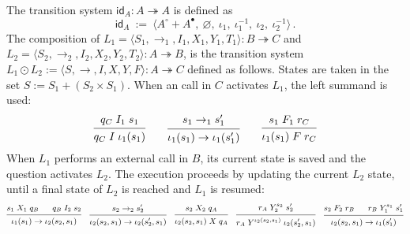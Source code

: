 \documentclass[acmsmall,screen,review,anonymous]{acmart}
\newcommand{\kw}[1]{\ensuremath{ \mathsf{#1} }}
\newcommand{\que}{\circ}
\newcommand{\ans}{\bullet}
\begin{document}
\begin{definition} \label{def:lcomp} %
The transition system
$\kw{id}_A : A \twoheadrightarrow A$
is defined as
\[
  \kw{id}_A \::=\:
  \big\langle
    A^\que + A^\ans, \:
    \varnothing, \:
    \iota_1, \:
    \iota_1^{-1}, \:
    \iota_2, \:
    \iota_2^{-1}
  \big\rangle
  \,.
\]
The composition of
$
  L_1 = \langle S_1, {\rightarrow_1}, I_1, X_1, Y_1, T_1 \rangle
    : B \twoheadrightarrow C
$ and $
  L_2 = \langle S_2, {\rightarrow_2}, I_2, X_2, Y_2, T_2 \rangle
    : A \twoheadrightarrow B
$,
is the transition system
$
  L_1 \odot L_2 :=
  \langle S, {\rightarrow}, I, X, Y, F \rangle
  : A \twoheadrightarrow C
$ defined as follows.
States are taken in the set
$
    S := S_1 + (S_2 \times S_1)
$.
When an call in $C$ activates $L_1$,
the left summand is used:
\[
  \begin{prooftree}
    \hypo{q_C \mathrel{I_1} s_1}
    \infer1{q_C \mathrel{I} \iota_1(s_1)}
  \end{prooftree}
  \qquad
  \begin{prooftree}
    \hypo{s_1 \rightarrow_1 s_1'}
    \infer1{\iota_1(s_1) \rightarrow \iota_1(s_1')}
  \end{prooftree}
  \qquad
  \begin{prooftree}
    \hypo{s_1 \mathrel{F_1} r_C}
    \infer1{\iota_1(s_1) \mathrel{F} r_C}
  \end{prooftree}
\]
When $L_1$ performs an external call in $B$,
its current state is saved and
the question activates $L_2$.
The execution proceeds
by updating the current $L_2$ state,
until a final state of $L_2$ is reached
and $L_1$ is resumed:
\[
  \small
  \begin{prooftree}
    \hypo{s_1 \mathrel{X_1} q_B}
    \hypo{q_B \mathrel{I_2} s_2}
    \infer2{\iota_1(s_1) \rightarrow \iota_2(s_2, s_1)}
  \end{prooftree}
  \quad
  \begin{prooftree}
    \hypo{s_2 \rightarrow_2 s_2'}
    \infer1{\iota_2(s_2, s_1) \rightarrow \iota_2(s_2', s_1)}
  \end{prooftree}
  \quad
  \begin{prooftree}
    \hypo{s_2 \mathrel{X_2} q_A}
    \infer1{\iota_2(s_2, s_1) \mathrel{X} q_A}
  \end{prooftree}
  \quad
  \begin{prooftree}
    \hypo{r_A \mathrel{Y_2^{s_2}} s_2'}
    \infer1{r_A \mathrel{Y^{\iota_2(s_2, s_1)}} \iota_2(s_2', s_1)}
  \end{prooftree}
  \quad
  \begin{prooftree}
    \hypo{s_2 \mathrel{F_2} r_B}
    \hypo{r_B \mathrel{Y_1^{s_1}} s_1'}
    \infer2{\iota_2(s_2, s_1) \rightarrow \iota_1(s_1')}
  \end{prooftree}
\]
\end{definition}
\end{document}
